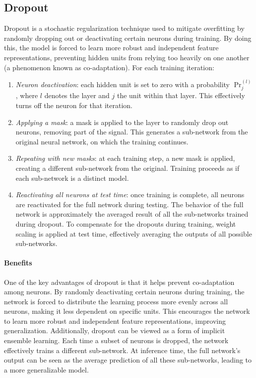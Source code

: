 \subsection{Dropout}
Dropout is a stochastic regularization technique used to mitigate overfitting by randomly dropping out or deactivating certain neurons during training. 
By doing this, the model is forced to learn more robust and independent feature representations, preventing hidden units from relying too heavily on one another (a phenomenon known as co-adaptation).
For each training iteration:
\begin{enumerate}
    \item \textit{Neuron deactivation}: each hidden unit is set to zero with a probability $\Pr^{(l)}_j$, where $l$ denotes the layer and $j$ the unit within that layer. 
        This effectively turns off the neuron for that iteration.
    \item \textit{Applying a mask}: a mask is applied to the layer to randomly drop out neurons, removing part of the signal. 
        This generates a sub-network from the original neural network, on which the training continues.
    \item \textit{Repeating with new masks}: at each training step, a new mask is applied, creating a different sub-network from the original. 
        Training proceeds as if each sub-network is a distinct model.
    \item \textit{Reactivating all neurons at test time}: once training is complete, all neurons are reactivated for the full network during testing. 
        The behavior of the full network is approximately the averaged result of all the sub-networks trained during dropout. 
        To compensate for the dropouts during training, weight scaling is applied at test time, effectively averaging the outputs of all possible sub-networks.
\end{enumerate}
\paragraph*{Benefits}
One of the key advantages of dropout is that it helps prevent co-adaptation among neurons. 
By randomly deactivating certain neurons during training, the network is forced to distribute the learning process more evenly across all neurons, making it less dependent on specific units. 
This encourages the network to learn more robust and independent feature representations, improving generalization. 
Additionally, dropout can be viewed as a form of implicit ensemble learning. 
Each time a subset of neurons is dropped, the network effectively trains a different sub-network. 
At inference time, the full network's output can be seen as the average prediction of all these sub-networks, leading to a more generalizable model.

